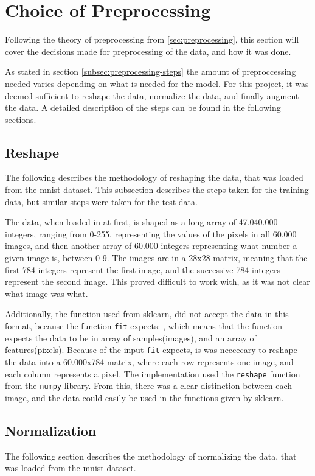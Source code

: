\section{Choice of Preprocessing}
Following the theory of preprocessing from \ref{sec:preprocessing}, this section will cover the decisions made for preprocessing of the data, and how it was done.

As stated in section \ref{subsec:preprocessing-steps} the amount of preproccessing needed varies depending on what is needed for the model. For this project, it was deemed sufficient to reshape the data, normalize the data, and finally augment the data. A detailed description of the steps can be found in the following sections.

\subsection{Reshape}
The following describes the methodology of reshaping the data, that was loaded from the \gls{mnist} dataset. This subsection describes the steps taken for the training data, but similar steps were taken for the test data.

The data, when loaded in at first, is shaped as a long array of 47.040.000 integers, ranging from 0-255, representing the values of the pixels in all 60.000 images, and then another array of 60.000 integers representing what number a given image is, between 0-9. The images are in a 28x28 matrix, meaning that the first 784 integers represent the first image, and the successive 784 integers represent the second image. This proved difficult to work with, as it was not clear what image was what.

Additionally, the function used from \gls{sklearn}, did not accept the data in this format, because the function \texttt{fit} expects: , which means that the function expects the data to be in array of samples(images), and an array of features(pixels). Because of the input \texttt{fit} expects, is was neccecary to reshape the data into a 60.000x784 matrix, where each row represents one image, and each column represents a pixel. The implementation used the \texttt{reshape} function from the \texttt{numpy} library. From this, there was a clear distinction between each image, and the data could easily be used in the functions given by \gls{sklearn}.

\subsection{Normalization} 
The following section describes the methodology of normalizing the data, that was loaded from the \gls{mnist} dataset.

